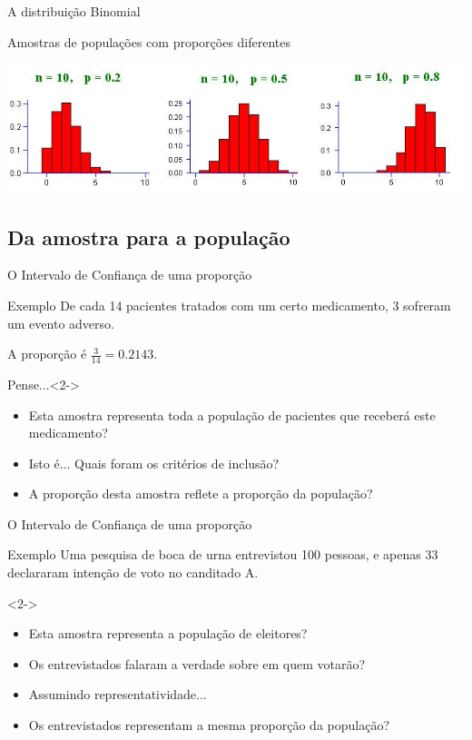 \documentclass{beamer}
\begin{document}
\begin{frame}{A distribuição Binomial}
  \begin{block}{}
    Amostras de populações com proporções diferentes
  \end{block}

  \includegraphics[width=\textwidth]{Prob_II/binomial}
\end{frame}

\subsection{Da amostra para a população}

\begin{frame}{O Intervalo de Confiança de uma proporção}
  \begin{exampleblock}{Exemplo}
    De cada 14 pacientes tratados com um certo medicamento, 3 sofreram um evento adverso.

    A proporção é $\frac{3}{14} = 0.2143$.
  \end{exampleblock}
  \begin{block}{Pense...}<2->
    \begin{itemize}
    \item Esta amostra representa toda a população de pacientes que receberá este medicamento?
    \item<3-> Isto é... Quais foram os critérios de inclusão?
    \item<4-> A proporção desta amostra reflete a proporção da população?
    \end{itemize}
  \end{block}

\end{frame}

\begin{frame}{O Intervalo de Confiança de uma proporção}
    \begin{exampleblock}{Exemplo}
    Uma pesquisa de boca de urna entrevistou 100 pessoas, e apenas 33 declararam intenção de voto no canditado A.

  \end{exampleblock}
  \begin{block}{}<2->
    \begin{itemize}
    \item Esta amostra representa a população de eleitores?
    \item<3-> Os entrevistados falaram a verdade sobre em quem votarão?
    \item<4-> Assumindo representatividade...
    \item<4-> Os entrevistados representam a mesma proporção da população?
    \end{itemize}
  \end{block}
\end{frame}
\end{document}
